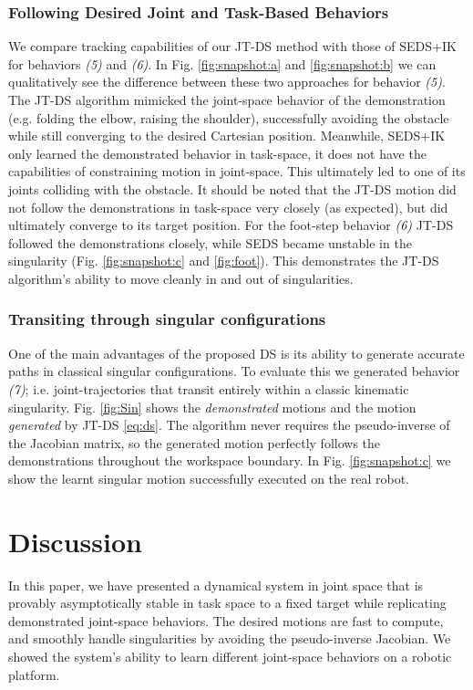 \documentclass[letterpaper, 10 pt, conference,fleqn]{ieeeconf}
\begin{document}
\subsubsection{Following Desired Joint and Task-Based Behaviors}
We compare tracking capabilities of our JT-DS method with those of SEDS+IK for behaviors \textit{(5)} and \textit{(6)}. In Fig. \ref{fig:snapshot:a} and \ref{fig:snapshot:b} we can qualitatively see the difference between these two approaches for behavior \textit{(5)}. The JT-DS algorithm mimicked the joint-space behavior of the demonstration (e.g. folding the elbow, raising the shoulder), successfully avoiding the obstacle while still converging to the desired Cartesian position. Meanwhile, SEDS+IK only learned the demonstrated behavior in task-space, it does not have the capabilities of constraining motion in joint-space. This ultimately led to one of its joints colliding with the obstacle. It should be noted that the JT-DS motion did not follow the demonstrations in task-space very closely (as expected), but did ultimately converge to its target position. For the foot-step behavior \textit{(6)} JT-DS followed the demonstrations closely, while SEDS became unstable in the singularity (Fig. \ref{fig:snapshot:c} and \ref{fig:foot}). This demonstrates the JT-DS algorithm's ability to move cleanly in and out of singularities.

\subsubsection{Transiting through singular configurations}
One of the main advantages of the proposed DS is its ability to generate accurate paths in classical singular configurations. To evaluate this we generated behavior \textit{(7)}; i.e. joint-trajectories that transit entirely within a classic kinematic singularity. Fig. \ref{fig:Sin} shows the \textit{demonstrated} motions and the motion  \textit{generated} by JT-DS \eqref{eq:ds}. The algorithm never requires the pseudo-inverse of the Jacobian matrix, so the generated motion perfectly follows the demonstrations throughout the workspace boundary. In Fig. \ref{fig:snapshot:c} we show the learnt singular motion successfully  executed on the real robot.

\section{Discussion} 
\label{Sec:Dis}
In this paper, we have presented a dynamical system in joint space that is provably asymptotically stable in task space to a fixed target while replicating demonstrated joint-space behaviors. The desired motions are fast to compute, and smoothly handle singularities by avoiding the pseudo-inverse Jacobian.  We showed the system's ability to learn different joint-space behaviors on a robotic platform.
\end{document}
